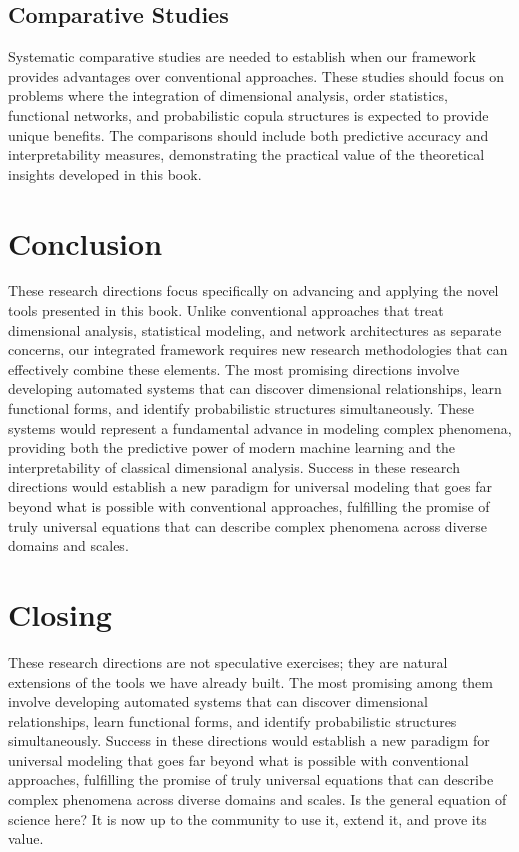 \subsection{Comparative Studies}
Systematic comparative studies are needed to establish when our framework provides advantages over conventional approaches. These studies should focus on problems where the integration of dimensional analysis, order statistics, functional networks, and probabilistic copula structures is expected to provide unique benefits.
The comparisons should include both predictive accuracy and interpretability measures, demonstrating the practical value of the theoretical insights developed in this book.

\section{Conclusion}
These research directions focus specifically on advancing and applying the novel tools presented in this book. Unlike conventional approaches that treat dimensional analysis, statistical modeling, and network architectures as separate concerns, our integrated framework requires new research methodologies that can effectively combine these elements.
The most promising directions involve developing automated systems that can discover dimensional relationships, learn functional forms, and identify probabilistic structures simultaneously. These systems would represent a fundamental advance in modeling complex phenomena, providing both the predictive power of modern machine learning and the interpretability of classical dimensional analysis.
Success in these research directions would establish a new paradigm for universal modeling that goes far beyond what is possible with conventional approaches, fulfilling the promise of truly universal equations that can describe complex phenomena across diverse domains and scales.

\section*{Closing}
These research directions are not speculative exercises; they are natural extensions of the tools we have already built. The most promising among them involve developing automated systems that can discover dimensional relationships, learn functional forms, and identify probabilistic structures simultaneously. Success in these directions would establish a new paradigm for universal modeling that goes far beyond what is possible with conventional approaches, fulfilling the promise of truly universal equations that can describe complex phenomena across diverse domains and scales. Is the general equation of science here? It is now up to the community to use it, extend it, and prove its value.

